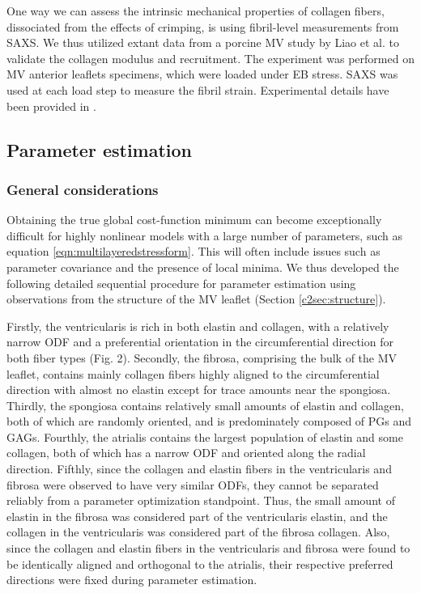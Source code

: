     One way we can assess the intrinsic mechanical properties of collagen fibers, dissociated from the effects of crimping, is using fibril-level measurements from SAXS. We thus utilized extant data from a porcine MV study by Liao et al. \cite{liao_relation_2007} to validate the collagen modulus and recruitment. The experiment was performed on MV anterior leaflets specimens, which were loaded under EB stress. SAXS was used at each load step to measure the fibril strain. Experimental details have been provided in \cite{liao_relation_2007}.
    



\subsection{Parameter estimation}

\subsubsection{General considerations}

    Obtaining the true global cost-function minimum can become exceptionally difficult for highly nonlinear models with a large number of parameters, such as equation \ref{eqn:multilayeredstressform}. This will often include issues such as parameter covariance and the presence of local minima. We thus developed the following detailed sequential procedure for parameter estimation using observations from the structure of the MV leaflet (Section \ref{c2sec:structure}).
    
    
    Firstly, the ventricularis is rich in both elastin and collagen, with a relatively narrow ODF and a preferential orientation in the circumferential direction for both fiber types (Fig. 2). Secondly, the fibrosa, comprising the bulk of the MV leaflet, contains mainly collagen fibers highly aligned to the circumferential direction with almost no elastin except for trace amounts near the spongiosa. Thirdly, the spongiosa contains relatively small amounts of elastin and collagen, both of which are randomly oriented, and is predominately composed of PGs and GAGs. Fourthly, the atrialis contains the largest population of elastin and some collagen, both of which has a narrow ODF and oriented along the radial direction. Fifthly, since the collagen and elastin fibers in the ventricularis and fibrosa were observed to have very similar ODFs, they cannot be separated reliably from a parameter optimization standpoint. Thus, the small amount of elastin in the fibrosa was considered part of the ventricularis elastin, and the collagen in the ventricularis was considered part of the fibrosa collagen. Also, since the collagen and elastin fibers in the ventricularis and fibrosa were found to be identically aligned and orthogonal to the atrialis, their respective preferred directions were fixed during parameter estimation.
    
